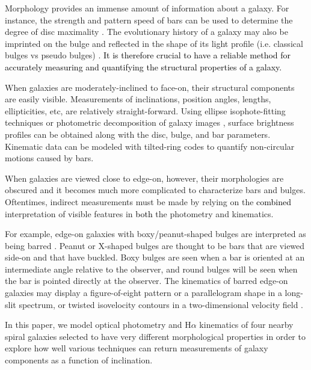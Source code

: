 \documentclass[a4paper,fleqn,usenatbib]{mnras}
\newcommand{\authorfix}{\textcolor{black}}
\begin{document}
Morphology provides an immense amount of information about a galaxy.  For instance, the strength and pattern speed of bars can be used to determine the degree of disc maximality \citep{athanassoula2003, block2004, byrd2006}. The evolutionary history of a galaxy may also be imprinted on the bulge and reflected in the shape of its light profile (i.e. classical bulges vs pseudo bulges) \citep{fisher2008, gadotti2009, weinzirl2009, barentine2012, perez2013, menendez2014}. \authorfix{It is therefore crucial to have a reliable method for accurately measuring and quantifying the structural properties of a galaxy.}

When galaxies are moderately-inclined to face-on, their structural components are easily visible.  Measurements of inclinations, position angles, lengths, ellipticities, etc, are relatively straight-forward. Using ellipse isophote-fitting techniques or photometric decomposition of galaxy images \citep{peng2002, gadotti2008}, surface brightness profiles can be obtained along with the disc, bulge, and bar parameters.  Kinematic data can be modeled with tilted-ring codes \citep[e.g. ROTCUR or TiRiFiC:][]{begeman1989, joza2007} to quantify non-circular motions caused by bars.

When galaxies are viewed close to edge-on, however, their morphologies are obscured and it becomes much more complicated to characterize bars and bulges.  Oftentimes, indirect measurements must be made by relying on the \authorfix{combined} interpretation of visible features in \authorfix{both} the photometry and kinematics.

For example, edge-on galaxies with boxy/peanut-shaped bulges are interpreted as being barred \citep{combes1981, combes1990, bundy2015, lutticke2000b, bureau2006}. Peanut or X-shaped bulges are thought to be bars that are viewed side-on and that have buckled.  Boxy bulges are seen when a bar is oriented at an intermediate angle relative to the observer, and round bulges will be seen when the bar is pointed directly at the observer.  The kinematics of barred edge-on galaxies may display a figure-of-eight pattern or a parallelogram shape in a long-slit spectrum, or twisted isovelocity contours in a two-dimensional velocity field \citep{kuijken1995, bureau1999b, athanassoula1999, merrifield1999, bureau2005}.

In this paper, we model optical photometry and H$\alpha$ kinematics of four nearby spiral galaxies selected to have very different morphological properties in order to explore how well various techniques can return measurements of galaxy components as a function of inclination.
\end{document}

